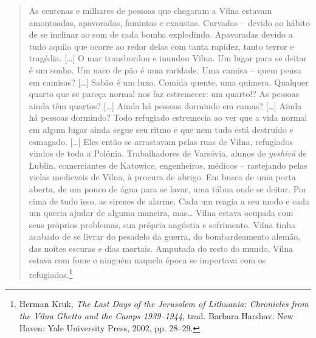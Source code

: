\begin{quote}
As centenas e milhares de pessoas que chegaram a Vilna estavam
amontoadas, apavoradas, famintas e exaustas. Curvadas -- devido ao hábito
de se inclinar ao som de cada bomba explodindo. Apavoradas devido a tudo
aquilo que ocorre ao redor delas com tanta rapidez, tanto terror e
tragédia. [\ldots{}] O mar transbordou e inundou Vilna. Um lugar para se
deitar é um sonho. Um naco de pão é uma raridade. Uma camisa -- quem
pensa em camisas? [\ldots{}] Sabão é um luxo. Comida quente, uma quimera.
Qualquer quarto que se pareça normal nos faz estremecer: um quarto!? As
pessoas ainda têm quartos? [\ldots{}] Ainda há pessoas dormindo em camas?
[\ldots{}] Ainda há pessoas dormindo? Todo refugiado estremecia ao ver que
a vida normal em algum lugar ainda segue seu ritmo e que nem tudo está
destruído e esmagado. [\ldots{}] Eles então se arrastavam pelas ruas de
Vilna, refugiados vindos de toda a Polônia. Trabalhadores de Varsóvia,
alunos de \textit{yeshivá} de Lublin, comerciantes de Katowice, engenheiros,
médicos -- rastejando pelas vielas medievais de Vilna, à procura de
abrigo. Em busca de uma porta aberta, de um pouco de água para se lavar,
uma tábua onde se deitar. Por cima de tudo isso, as sirenes de alarme.
Cada um reagia a seu modo e cada um queria ajudar de alguma maneira,
mas\ldots{} Vilna estava ocupada com seus próprios problemas, sua
própria angústia e sofrimento. Vilna tinha acabado de se livrar do
pesadelo da guerra, do bombardeamento alemão, das noites escuras e dias
mortais. Amputada do resto do mundo, Vilna estava com fome e ninguém
naquela época se importava com os refugiados.\footnote{Herman Kruk, \textit{The Last Days of the Jerusalem of Lithuania: Chronicles from the Vilna Ghetto and the Camps 1939--1944}, trad. Barbara Harshav. New Haven: Yale University Press, 2002, pp. 28--29.}
\end{quote}

